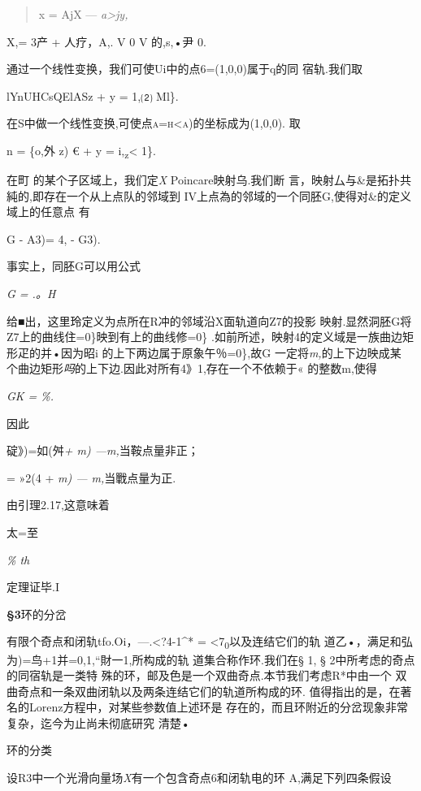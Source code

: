 \documentclass{article}
\begin{document}
\begin{quote}
x = AjX --- \emph{a\textgreater{}jy,}
\end{quote}

X,= 3产 + 人疗，A,. V 0 V 的,s,•尹 0.

通过一个线性变换，我们可使Ui中的点6=(1,0,0)属于q的同 宿轨.我们取

lYnUHCsQElASz + y = 1,⑵ Ml\}.

在S中做一个线性变换,可使点\textsc{a=h\textless{}a)}的坐标成为(1,0,0). 取

n = \{o,外 z) € + y = i,\textbar{}\textsubscript{z}\textbar{}\textless{}
1\}.

在町 的某个子区域上，我们定\emph{X} Poincare映射乌.我们断
言，映射厶与\&是拓扑共純的,即存在一个从上点队的邻域到
IV上点為的邻域的一个同胚G,使得对\&的定义域上的任意点 有

G - A3)= 4, - G3).

事实上，同胚G可以用公式

\emph{G = .。H}

给■出，这里玲定义为点所在R冲的邻域沿X面轨道向Z7的投影
映射.显然洞胚G将Z7上的曲线住=0\}映到有上的曲线修=0\}
.如前所述，映射4的定义域是一族曲边矩形疋的并•因为昭i
的上下两边属于原象午％=0\},故G 一定将\emph{m,}的上下边映成某
个曲边矩形\emph{吗}的上下边.因此对所有4》1,存在一个不依赖于«
的整数m,使得

\emph{GK = \%.}

因此

碇》)=如(舛\emph{+ m) ---m,}当鞍点量非正；

= »2(4 + \emph{m) --- m,}当戰点量为正.

由引理2.17,这意味着

太=至

\emph{\% th}

定理证毕.I

\protect\hypertarget{bookmark278}{}{}\textbf{§3}环的分岔

有限个奇点和闭轨tfo.Oi，---.\textless{}?4-1\^{}* =
\textless{}7\textsubscript{0}以及连结它们的轨
道乙•，满足和弘为)=鸟+1并=0,1,``財一1,所构成的轨 道集合称作环.我们在§ 1,
§ 2中所考虑的奇点的同宿轨是一类特
殊的环，邮及色是一个双曲奇点.本节我们考虑R*中由一个
双曲奇点和一条双曲闭轨以及两条连结它们的轨道所构成的环.
值得指出的是，在著名的Lorenz方程中，对某些参数值上述环是
存在的，而且环附近的分岔现象非常复杂，迄今为止尚未彻底研究 清楚•

环的分类

设R3中一个光滑向量场\emph{X}有一个包含奇点6和闭轨电的环
A,满足下列四条假设
\end{document}
